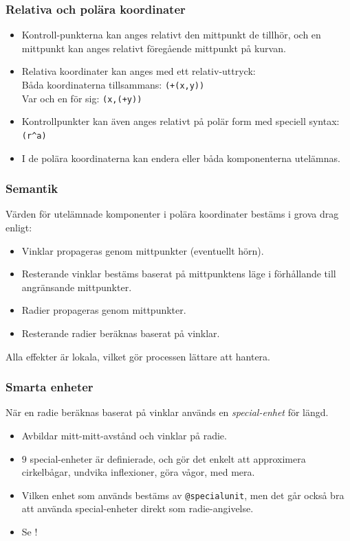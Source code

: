 \documentclass[noamsthm,handout]{beamer}
\begin{document}
\begin{frame}\frametitle{Relativa och polära koordinater}
  \begin{itemize}
  \item Kontroll-punkterna kan anges relativt den mittpunkt de tillhör, och en mittpunkt kan anges relativt föregående mittpunkt på kurvan.
  \item Relativa koordinater kan anges med ett relativ-uttryck:\\
    Båda koordinaterna tillsammans: \texttt{{\color{red}(+}(x,y){\color{red})}}\\
    Var och en för sig: \texttt{(x,{\color{red}(+}y{\color{red})})}
  \item Kontrollpunkter kan även anges relativt på polär form med speciell syntax:\\
    \texttt{{\color{red}(}r{\color{red}\textasciicircum}a{\color{red})}}
  \item I de polära koordinaterna kan endera eller båda komponenterna utelämnas.
  \end{itemize}
\end{frame}
\begin{frame}\frametitle{Semantik}
  Värden för utelämnade komponenter i polära koordinater bestäms i grova drag enligt:
  \begin{itemize}
  \item Vinklar propageras genom mittpunkter (eventuellt hörn).
  \item Resterande vinklar bestäms baserat på mittpunktens läge i förhållande till angränsande mittpunkter.
  \item Radier propageras genom mittpunkter.
  \item Resterande radier beräknas baserat på vinklar.
  \end{itemize}

  Alla effekter är lokala, vilket gör processen lättare att hantera.
\end{frame}
\begin{frame}\frametitle{Smarta enheter}
  När en radie beräknas baserat på vinklar används en \emph{special-enhet} för längd.
  \begin{itemize}
  \item Avbildar mitt-mitt-avstånd och vinklar på radie.
  \item $9$ special-enheter är definierade, och gör det enkelt att approximera cirkelbågar, undvika inflexioner, göra vågor, med mera.
  \item Vilken enhet som används bestäms av \texttt{@specialunit}, men det går också bra att använda special-enheter direkt som radie-angivelse.
  \item Se !
  \end{itemize}
\end{frame}
\end{document}
